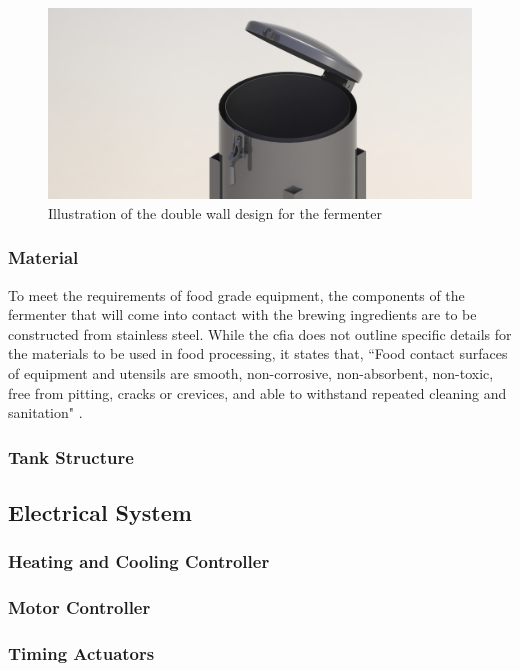 \documentclass{article}
\begin{document}
\begin{figure}[H]
\begin{center}
\includegraphics[scale=0.20]{fermenter-wall-cad.png}
\caption{Illustration of the double wall design for the fermenter}
\label{fig:fermenter-wall-cad}
\end{center}
\end{figure}

\subsubsection{Material}
To meet the requirements of food grade equipment, the components of the fermenter that will come into contact with the brewing ingredients are to be constructed from stainless steel.  While the \gls{cfia} does not outline specific details for the materials to be used in food processing, it states that, ``Food contact surfaces of equipment and utensils are smooth, non-corrosive, non-absorbent, non-toxic, free from pitting, cracks or crevices, and able to withstand repeated cleaning and sanitation" \cite{food-grade}.

\subsubsection{Tank Structure}

\subsection{Electrical System}
\subsubsection{Heating and Cooling Controller}
\subsubsection{Motor Controller}
\subsubsection{Timing Actuators}
\end{document}
